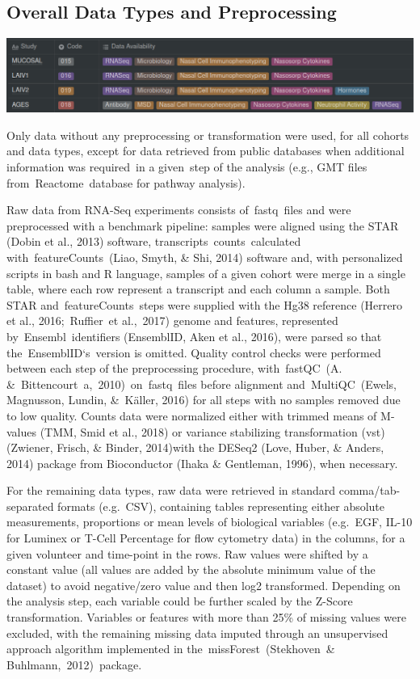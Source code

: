 \documentclass[
]{book}
\begin{document}
\hypertarget{overall-data-types-and-preprocessing}{%
\subsection{Overall Data Types and Preprocessing}\label{overall-data-types-and-preprocessing}}

\includegraphics{images/paste-13C4D4A9.png}

Only data without any preprocessing or transformation were used, for all cohorts and data types, except for data retrieved from public databases when additional information was required~in a given~step of the analysis (e.g., GMT files from~Reactome~database for pathway analysis).

Raw data from RNA-Seq experiments consists of~fastq~files and were preprocessed with a benchmark pipeline: samples were aligned using the STAR (Dobin et al., 2013)⁠ software, transcripts~counts~calculated with~featureCounts~(Liao, Smyth, \& Shi, 2014)⁠ software and, with personalized scripts in bash and R language, samples of a given cohort were merge in a single table, where each row represent a transcript and each column a sample. Both STAR and~featureCounts~steps were supplied with the Hg38 reference (Herrero et al., 2016;~Ruffier~et al.,~2017)⁠⁠ genome and features, represented by~Ensembl~identifiers (EnsemblID, Aken et al., 2016), were parsed so that the~EnsemblID`s~version is omitted. Quality control checks were performed between each step of the preprocessing procedure, with~fastQC~(A. \&~Bittencourt~a,~2010)⁠~on~fastq~files before alignment and~MultiQC~(Ewels, Magnusson, Lundin, \&~Käller, 2016)⁠ for all steps with no samples removed due to low quality. Counts data were normalized either with trimmed means of M-values (TMM, Smid et al., 2018)⁠ or variance stabilizing transformation (vst) (Zwiener, Frisch, \& Binder, 2014)⁠with the DESeq2 (Love, Huber, \& Anders, 2014)⁠ package from Bioconductor (Ihaka \& Gentleman, 1996)⁠⁠, when necessary.

For the remaining data types, raw data were retrieved in standard comma/tab-separated formats (e.g.~CSV), containing tables representing either absolute measurements, proportions or mean levels of biological variables (e.g.~EGF, IL-10 for Luminex or T-Cell Percentage for flow cytometry data) in the columns, for a given volunteer and time-point in the rows. Raw values were shifted by a constant value (all values are added by the absolute minimum value of the dataset) to avoid negative/zero value and then log2 transformed. Depending on the analysis step, each variable could be further scaled by the Z-Score transformation. Variables or features with more than 25\% of missing values were excluded, with the remaining missing data imputed through an unsupervised approach algorithm implemented in the~missForest~(Stekhoven~\& Buhlmann,~2012)⁠~package.
\end{document}

